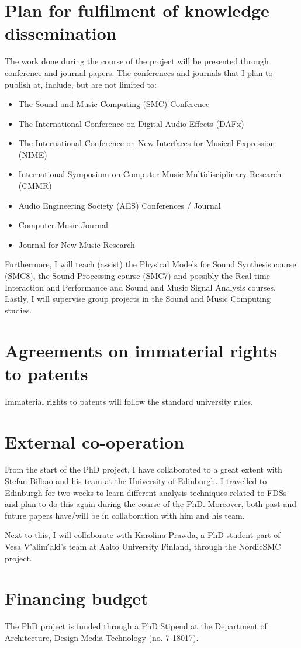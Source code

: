 \section{Plan for fulfilment of knowledge dissemination}
The work done during the course of the project will be presented through conference and journal papers. The conferences and journals that I plan to publish at, include, but are not limited to:
\begin{itemize}
\item The Sound and Music Computing (SMC) Conference
\item The International Conference on Digital Audio Effects (DAFx)
\item The International Conference on New Interfaces for Musical Expression (NIME)
\item International Symposium on Computer Music Multidisciplinary Research (CMMR)
\item Audio Engineering Society (AES) Conferences / Journal
\item Computer Music Journal
\item Journal for New Music Research
\end{itemize}
Furthermore, I will teach (assist) the Physical Models for Sound Synthesis course (SMC8), the Sound Processing course (SMC7) and possibly the Real-time Interaction and Performance and Sound and Music Signal Analysis courses. Lastly, I will supervise group projects in the Sound and Music Computing studies.

\section{Agreements on immaterial rights to patents}
Immaterial rights to patents will follow the standard university rules.

\section{External co-operation}
From the start of the PhD project,  I have collaborated to a great extent with Stefan Bilbao and his team at the University of Edinburgh. I travelled to Edinburgh for two weeks to learn different analysis techniques related to FDSs and plan to do this again during the course of the PhD. Moreover, both past and future papers have/will be in collaboration with him and his team.

Next to this, I will collaborate with Karolina Prawda, a PhD student part of Vesa V\''alim\''aki's team at Aalto University Finland, through the NordicSMC project.

\section{Financing budget}
The PhD project is funded through a PhD Stipend at the Department of Architecture, Design Media Technology (no. 7-18017).
